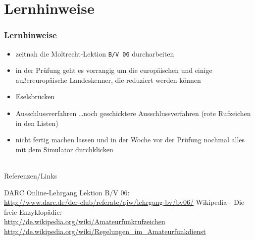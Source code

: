 \section{Lernhinweise}

\begin{frame}
  \frametitle{Lernhinweise}

  \begin{itemize}
    \item zeitnah die Moltrecht-Lektion \texttt{B/V 06} durcharbeiten
    \item in der Prüfung geht es vorrangig um die europäischen und einige
      außereuropäische Landeskenner, die reduziert werden können
    \item Eselsbrücken
    \item Ausschlussverfahren
      \ldots noch geschicktere Ausschlussverfahren (rote Rufzeichen in den Listen)
    \item nicht fertig machen lassen und in der Woche vor der Prüfung
      nochmal alles mit dem Simulator durchklicken
  \end{itemize}

\end{frame}


\renewcommand{\refname}{Referenzen}

\hypertarget{refs}{}
\textcolor{white}{} \\ %
\Large Referenzen/Links
\footnotesize

\begin{thebibliography}{}
    DARC Online-Lehrgang Lektion B/V 06: \\
    \url{http://www.darc.de/der-club/referate/ajw/lehrgang-bv/bv06/}
      Wikipedia - Die freie Enzyklopädie: \\
    \url{http://de.wikipedia.org/wiki/Amateurfunkrufzeichen} \\
    \url{http://de.wikipedia.org/wiki/Regelungen_im_Amateurfunkdienst}
\end{thebibliography}


